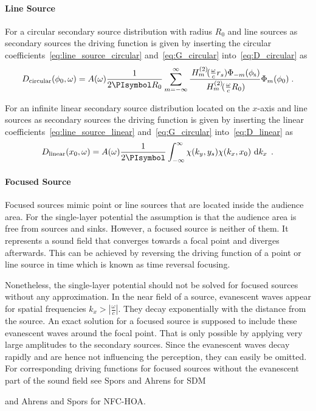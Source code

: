 \documentclass[a4paper]{book}
\newcommand{\PI}{\PIsymbol}%
\newcommand{\D}[1]{\mathop{\mathrm{d}{#1}}}          %
\newcommand{\omegac}{\frac{\omega}{c}}               %
\renewcommand{\H}[2]{\,H_{#1}^{(#2)}\!}              %
\newcommand{\qp}{\;.}                                             %
\begin{document}
{%
\paragraph{Line Source}
%
For a circular secondary source distribution with radius $R_0$ and line sources
as secondary sources the driving function is given by inserting the
circular coefficients~\eqref{eq:line_source_circular} and~\eqref{eq:G_circular}
into~\eqref{eq:D_circular} as
%
\begin{equation}
    D_{\text{circular}}(\phi_0,\omega) = A(\omega) \frac{1}{2\PI R_0}
        \sum_{m=-\infty}^{\infty}
        \frac{\H{m}{2}(\omegac r_s) \Phi_{-m}(\phi_\text{s})}
        {\H{m}{2}(\omegac R_0)} \Phi_m(\phi_0) \qp
    \label{eq:D_nfchoa_ls_2D}
\end{equation}
%

For an infinite linear secondary source distribution located on the $x$-axis and
line sources as secondary sources the driving function is given by inserting the
linear coefficients~\eqref{eq:line_source_linear} and~\eqref{eq:G_circular}
into~\eqref{eq:D_linear} as
%
\begin{equation}
    D_\text{linear}(x_0,\omega) = A(\omega) \frac{1}{2\PI}
    \int_{-\infty}^\infty \chi(k_y,y_s) \chi(k_x,x_0) \, \D{k_x} \qp
\end{equation}
%


\paragraph{Focused Source}
%
Focused sources mimic point or line sources that are located inside the audience
area. For the single-layer potential the assumption is that the audience area is
free from sources and sinks. However, a focused source is neither of them. It
represents a sound field that converges towards a focal point and diverges
afterwards. This can be achieved by reversing the driving function of a point or
line source in time which is known as time reversal
focusing.\cite{Yon2003}

Nonetheless, the single-layer potential should not be solved for focused sources
without any approximation. In the near field of a source,
evanescent
waves\cite[][p.\,24]{Williams1999} appear for spatial frequencies $k_x > |\omegac|$.
They decay exponentially with the distance from the source. An exact solution for a focused
source is supposed to include these evanescent waves around the focal point.
That is only
possible by applying very large amplitudes to the secondary
sources.\cite[Compare Fig.\,2a in][]{Spors2010}
Since the evanescent waves decay rapidly and are hence not
influencing the perception, they can easily be omitted.
For corresponding driving functions for focused sources without the
evanescent part of the sound field see Spors and
Ahrens\cite{Spors2010} for
SDM} and Ahrens and Spors\cite{Ahrens2009d} for NFC-HOA.
\end{document}
